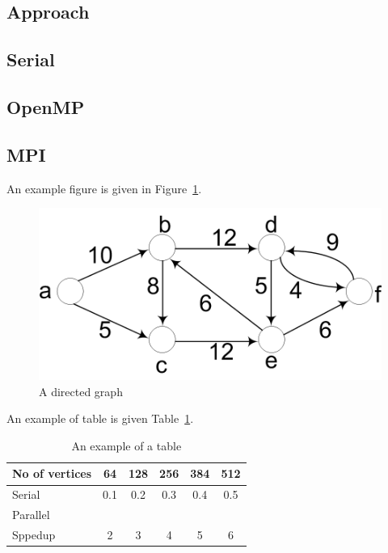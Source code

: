\subsection*{Approach}
\subsection{Serial}
\subsection{OpenMP}
\subsection{MPI}
An example figure is given in Figure~\ref{fig:sp_fig1}.
\begin{figure}[htb]
	\centering
	\includegraphics[width=0.5\linewidth]{pics/sp_fig1.png}
	\caption{A directed graph}\label{fig:sp_fig1}
\end{figure}

An example of table is given Table~\ref{tab:example}.
\begin{table}[htb]
	\centering
	\caption{An example of a table}\label{tab:example}
	\begin{tabular}{l|ccccc}
		\toprule
		No of vertices & 64 & 128 & 256 & 384 & 512\\
		\midrule
		Serial &0.1&0.2&0.3&0.4&0.5\\
		Parallel &&&&\\
		Sppedup &2&3&4&5&6\\
		\bottomrule
	\end{tabular}
\end{table} 

 

